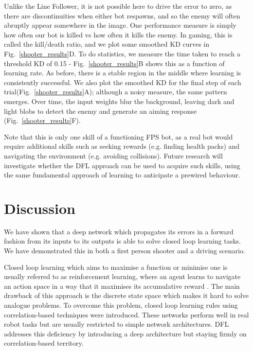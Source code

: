\documentclass{aamas2018}
\begin{document}
Unlike the Line Follower, it is not possible here to drive the error
to zero, as there are discontinuities when either bot respawns, and so
the enemy will often abruptly appear somewhere in the image. One
performance measure is simply how often our bot is killed vs how often
it kills the enemy. In gaming, this is called the kill/death ratio,
and we plot some smoothed KD curves in Fig.~\ref{shooter_results}D. To
do statistics, we measure the time taken to reach a threshold KD of 0.15 -
Fig.~\ref{shooter_results}B shows this as a function of learning
rate. As before, there is a stable region in the middle where learning
is consistently successful. We also plot the smoothed KD for the final
step of each trial(Fig.~\ref{shooter_results}A); although a noisy
measure, the same pattern emerges. Over time, the input weights blur
the background, leaving dark and light blobs to detect the enemy and
generate an aiming response (Fig.~\ref{shooter_results}F).

Note that this is only one skill of a functioning FPS bot, as a real bot would
require additional skills such as seeking rewards (e.g. finding health packs) and
navigating the environment (e.g. avoiding collisions). Future research
will investigate whether the DFL approach can be used to acquire such
skills, using the same fundamental approach of learning to anticipate
a prewired behaviour.


\section{Discussion}
We have shown that a deep network which propagates its errors in a forward
fashion from its inputs to its outputs is able to solve closed loop
learning tasks. We have demonstrated this in both a first person
shooter and a driving scenario.

Closed loop learning which aims to maximise a function or minimise one
is usually referred to as reinforcement learning, where an agent learns to
navigate an action space in a way that it maximises its accumulative
reward \cite{Dayan1992}. The main drawback of this approach
is the discrete state space which makes it hard to solve analogue
problems. To overcome this problem, closed loop learning rules using
correlation-based techniques \cite{Verschure91} were introduced.
These networks perform well in real robot tasks but are usually restricted to 
simple network architectures. DFL addresses this
deficiency by introducing a deep architecture but staying firmly
on correlation-based territory.
\end{document}
